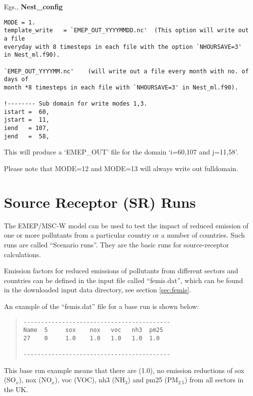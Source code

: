 Egs.,  {\bf Nest\_config}

\begin{verbatim}
MODE = 1.
template_write   = `EMEP_OUT_YYYYMMDD.nc'  (This option will write out a file 
everyday with 8 timesteps in each file with the option `NHOURSAVE=3' in Nest_ml.f90).  

`EMEP_OUT_YYYYMM.nc'    (will write out a file every month with no. of days of 
month *8 timesteps in each file with `NHOURSAVE=3' in Nest_ml.f90).
				
!-------- Sub domain for write modes 1,3. 
istart =  60,   
jstart =  11,   
iend   = 107,   
jend   =  58,   
\end{verbatim}

This will produce a `EMEP\_OUT' file for the domain `i=60,107 and j=11,58'.  

Please note that MODE=12 and MODE=13 will always write out fulldomain.   


\section {Source Receptor (SR) Runs}

The EMEP/MSC-W model can be used to test the impact of reduced emission of
one or more pollutants from a particular country or a number of
countries.  Such runs are called ``Scenario runs''. They are the basic
runs for source-receptor calculations.

Emission factors for reduced emissions of pollutants from different
sectors and countries can be defined in the input file called
``femis.dat'', which can be found in the downloaded input data
directory, see section \ref{sec:femis}.

An example of the ``femis.dat'' file for a base run is shown below:
\begin{quote}

\begin{verbatim}
------------------------------------------
Name  5     sox    nox   voc   nh3  pm25
27    0     1.0    1.0   1.0   1.0  1.0  

------------------------------------------
\end{verbatim}
\end{quote}
\noindent
This base run example means that there are (1.0), no emission reductions of 
sox (SO$_x$), nox (NO$_x$), voc (VOC), nh3 (NH$_3$) and pm25 (PM$_{2.5}$) from 
all sectors in the UK. 

